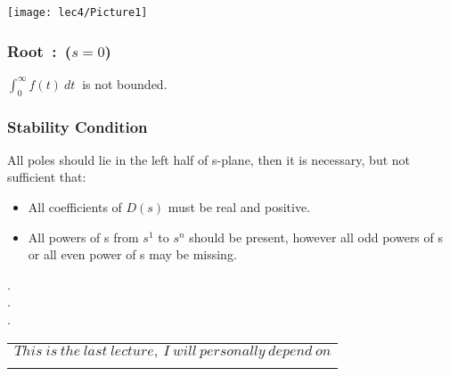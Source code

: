 \begin{figure*}[!h]
	\raggedleft
	\texttt{[image: lec4/Picture1]}
\end{figure*}

\subsubsection{Root\ :\ ($ s = 0 $)}

\centering
$\displaystyle{\int_0^\infty f(t)\ dt\ }$ is not bounded.
\justify
{}

\subsubsection{Stability Condition}

All poles should lie in the left half of s-plane, then it is necessary, but not sufficient that:\\

\begin{itemize}
  \item  All coefficients of $D(s)$ must be real and positive.\\
  \item  All powers of s from $s^1$ to $s^n$ should be present, however all odd powers of s or all even power of s may be missing.\\
\end{itemize}

\centering
\LARGE .\\
\LARGE .\\
\LARGE .\\

\begin{table*}[!b]
	\begin{tabular}{p{16cm}}
		\multicolumn{1}{m{16cm}}{\LARGE{$This\ is\ the\ last\ lecture,\ I\ will\ personally\ depend\ on$}}\\[+1em]
		\multicolumn{1}{r}{
			\fbox{
			    \parbox{8.2cm}{
			    	\LARGE{\href{https://drive.google.com/drive/folders/1G3lhSEKO3itcgrWF_8Sl6ArfrC4g3E8-}{$\ Dr.\ Imtiaz\ Hussain\ Lectures\ $}}
		    	}
			}
		}
		
	\end{tabular}
\end{table*}
\normalsize